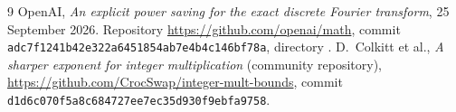 \documentclass[11pt]{article}
\theoremstyle{definition}
\begin{document}
\begin{thebibliography}{9}
 OpenAI, \emph{An explicit power saving for the exact discrete
  Fourier transform}, 25 September 2026. Repository
  \url{https://github.com/openai/math}, commit
  \texttt{adc7f1241b42e322a6451854ab7e4b4c146bf78a}, directory
  \allowbreak
  .
 D.~Colkitt et al., \emph{A sharper exponent for integer
  multiplication} (community repository),
  \url{https://github.com/CrocSwap/integer-mult-bounds}, commit
  \texttt{d1d6c070f5a8c684727ee7ec35d930f9ebfa9758}.
\end{thebibliography}
\end{document}
